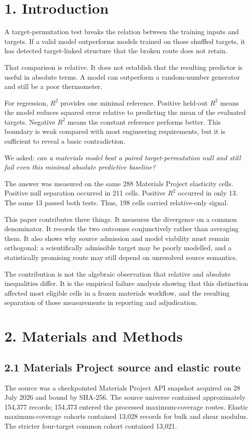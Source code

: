 \documentclass[10pt,a4paper]{article}
\begin{document}
\section{1. Introduction}
A target-permutation test breaks the relation between the training inputs and targets. If a valid model outperforms models trained on those shuffled targets, it has detected target-linked structure that the broken route does not retain.

That comparison is relative. It does not establish that the resulting predictor is useful in absolute terms. A model can outperform a random-number generator and still be a poor thermometer.

For regression, $R^2$ provides one minimal reference. Positive held-out $R^2$ means the model reduces squared error relative to predicting the mean of the evaluated targets. Negative $R^2$ means the constant reference performs better. This boundary is weak compared with most engineering requirements, but it is sufficient to reveal a basic contradiction.

We asked: \emph{can a materials model beat a paired target-permutation null and still fail even this minimal absolute predictive baseline?}

The answer was measured on the same 288 Materials Project elasticity cells. Positive null separation occurred in 211 cells. Positive $R^2$ occurred in only 13. The same 13 passed both tests. Thus, 198 cells carried relative-only signal.

This paper contributes three things. It measures the divergence on a common denominator. It records the two outcomes conjunctively rather than averaging them. It also shows why source admission and model viability must remain orthogonal: a scientifically admissible target may be poorly modelled, and a statistically promising route may still depend on unresolved source semantics.

The contribution is not the algebraic observation that relative and absolute inequalities differ. It is the empirical failure analysis showing that this distinction affected most eligible cells in a frozen materials workflow, and the resulting separation of those measurements in reporting and adjudication.

\section{2. Materials and Methods}
\subsection{2.1 Materials Project source and elastic route}
The source was a checkpointed Materials Project API snapshot acquired on 28 July 2026 and bound by SHA-256. The source universe contained approximately 154,377 records; 154,373 entered the processed maximum-coverage routes. Elastic maximum-coverage cohorts contained 13,028 records for bulk and shear modulus. The stricter four-target common cohort contained 13,021.
\end{document}
